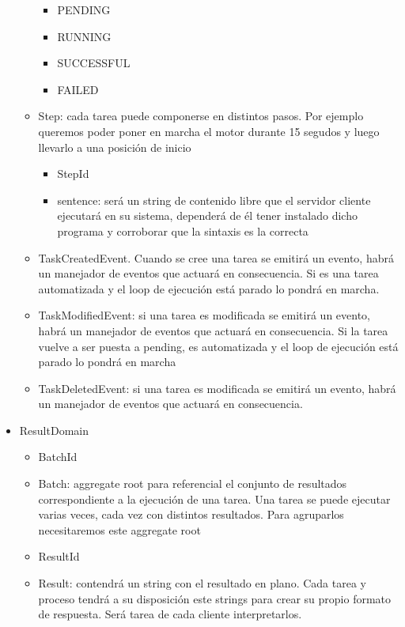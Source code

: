 \begin{itemize}
\begin{itemize}
        \begin{itemize}
            \item PENDING
            \item RUNNING
            \item SUCCESSFUL
            \item FAILED
        \end{itemize}
        \item Step: cada tarea puede componerse en distintos pasos. Por ejemplo queremos poder poner en marcha el motor durante 15 segudos y luego llevarlo a una posición de inicio
        \begin{itemize}
            \item StepId
            \item sentence: será un string de contenido libre que el servidor cliente ejecutará en su sistema, dependerá de él tener instalado dicho programa y corroborar que la sintaxis es la correcta
        \end{itemize}
        \item TaskCreatedEvent. Cuando se cree una tarea se emitirá un evento, habrá un manejador de eventos que actuará en consecuencia. Si es una tarea automatizada y el loop de ejecución está parado lo pondrá en marcha.
        \item TaskModifiedEvent: si una tarea es modificada se emitirá un evento, habrá un manejador de eventos que actuará en consecuencia. Si la tarea vuelve a ser puesta a pending, es automatizada y el loop de ejecución está parado lo pondrá en marcha
        \item TaskDeletedEvent: si una tarea es modificada se emitirá un evento, habrá un manejador de eventos que actuará en consecuencia.
    \end{itemize}
    \item ResultDomain
    \begin{itemize}
        \item BatchId
        \item Batch: aggregate root para referencial el conjunto de resultados correspondiente a la ejecución de una tarea. Una tarea se puede ejecutar varias veces, cada vez con distintos resultados. Para agruparlos necesitaremos este aggregate root
        \item ResultId
        \item Result: contendrá un string con el resultado en plano. Cada tarea y proceso tendrá a su disposición este strings para crear su propio formato de respuesta. Será tarea de cada cliente interpretarlos.
    \end{itemize}
\end{itemize}

